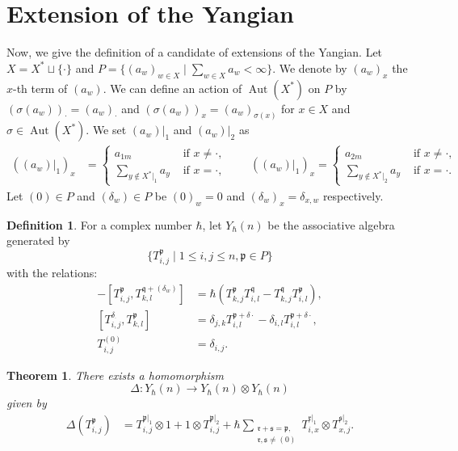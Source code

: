 \documentclass{article}
\newtheorem{Theorem}[equation]{Theorem}
\theoremstyle{definition}
\newtheorem{Definition}[equation]{Definition}
\theoremstyle{remark}
\numberwithin{equation}{section}
\DeclareMathOperator{\Aut}{Aut}
\numberwithin{equation}{section}
\begin{document}
\section{Extension of the Yangian}
Now, we give the definition of a candidate of extensions of the Yangian. Let $X=X^*\sqcup\{\cdot\}$ and $P=\{(a_w)_{w\in X}\mid \sum_{w\in X}a_w<\infty\}$. 
We denote by $(a_w)_x$ the $x$-th term of $(a_w)$. We can define an action of $\Aut(X^*)$ on $P$ by $(\sigma(a_w))_\cdot=(a_w)_\cdot$ and $(\sigma(a_w))_x=(a_w)_{\sigma(x)}$ for $x\in X$ and $\sigma\in\Aut(X^*)$. We set $(a_w)|_1$ and $(a_w)|_2$ as
\begin{align*}
((a_w)|_1)_x&=\begin{cases}
a_{1m}&\text{ if }x\neq\cdot,\\
\sum_{y\not\in X^*|_1}a_y&\text{ if }x=\cdot,
\end{cases}\qquad((a_w)|_1)_x=\begin{cases}
a_{2m}&\text{ if }x\neq\cdot,\\
\sum_{y\not\in X^*|_2}a_y&\text{ if }x=\cdot.
\end{cases}
\end{align*}
Let $(0)\in P$ and $(\delta_w)\in P$ be $(0)_w=0$ and $(\delta_w)_x=\delta_{x,w}$ respectively.
\begin{Definition}
For a complex number $\hbar$, let $Y_\hbar(n)$ be the associative algebra generated by
\[
\{T^{\mathfrak{p}}_{i,j}\mid1\leq i,j\leq n,\mathfrak{p}\in P\}
\]
with the relations:
\begin{align}
[T^{\mathfrak{p}+(\delta_w)}_{i,j},T^{\mathfrak{q}}_{k,l}]-[T^{\mathfrak{p}}_{i,j},T^{\mathfrak{q}+(\delta_w)}_{k,l}]
&=\hbar(T^{\mathfrak{p}}_{k,j}T^{\mathfrak{q}}_{i,l}-T^{\mathfrak{q}}_{k,j}T^{\mathfrak{p}}_{i,l}),\label{gatt1}\\
[T^{\delta_{\cdot}}_{i,j},T^{\mathfrak{p}}_{k,l}]
&=\delta_{j,k}T^{\mathfrak{p}+\delta{\cdot}}_{i,l}-\delta_{i,l}T^{\mathfrak{p}+\delta{\cdot}}_{i,l},\label{gatt2}\\
T^{(0)}_{i,j}&=\delta_{i,j}.\label{gatt3}
\end{align}
\end{Definition}
\begin{Theorem}\label{Thm1}
There exists a homomorphism 
\[\Delta\colon Y_\hbar(n)\to Y_\hbar(n)\otimes Y_\hbar(n)\]
given by
\begin{align*}
\Delta(T^{\mathfrak{p}}_{i,j})&=T^{\mathfrak{p}|_1}_{i,j}\otimes1+1\otimes T^{\mathfrak{p}|_2}_{i,j}+\hbar\sum_{\substack{\mathfrak{r}+\mathfrak{s}=\mathfrak{p},\\\mathfrak{r},\mathfrak{s}\neq(0)}}T^{\mathfrak{r}|_1}_{i,x}\otimes T^{\mathfrak{s}|_2}_{x,j}.
\end{align*}
\end{Theorem}
\end{document}
